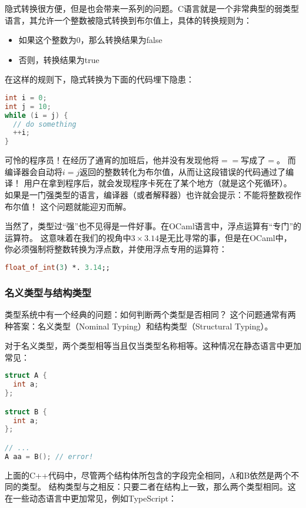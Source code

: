 \documentclass[../main.tex]{subfiles}
\begin{document}
  \indent 隐式转换很方便，但是也会带来一系列的问题。C语言就是一个非常典型的弱类型语言，其允许一个整数被隐式转换到布尔值上，具体的转换规则为：
  \begin{itemize}
    \item 如果这个整数为0，那么转换结果为false
    \item 否则，转换结果为true
  \end{itemize}

  \indent 在这样的规则下，隐式转换为下面的代码埋下隐患：

\begin{lstlisting}[language=c]
int i = 0;
int j = 10;
while (i = j) {
  // do something
  ++i;
}
\end{lstlisting}

  \indent 可怜的程序员！在经历了通宵的加班后，他并没有发现他将$==$写成了$=$。
  而编译器会自动将$i = j$返回的整数转化为布尔值，从而让这段错误的代码通过了编译！
  用户在拿到程序后，就会发现程序卡死在了某个地方（就是这个死循环）。
  如果是一门强类型的语言，编译器（或者解释器）也许就会提示：不能将整数视作布尔值！
  这个问题就能迎刃而解。

  \indent 当然了，类型过“强”也不见得是一件好事。在OCaml语言中，浮点运算有“专门”的运算符。
  这意味着在我们的视角中$3 \times 3.14$是无比寻常的事，但是在OCaml中，
  你必须强制将整数转换为浮点数，并使用浮点专用的运算符：

\begin{lstlisting}[language=ml]
float_of_int(3) *. 3.14;;
\end{lstlisting}

  \subsubsection*{名义类型与结构类型}
  \indent 类型系统中有一个经典的问题：如何判断两个类型是否相同？
  这个问题通常有两种答案：名义类型（Nominal Typing）和结构类型（Structural Typing）。

  \indent 对于名义类型，两个类型相等当且仅当类型名称相等。这种情况在静态语言中更加常见：

\begin{lstlisting}[language=c++]
struct A {
  int a;
};

struct B {
  int a;
};

// ...
A aa = B(); // error!
\end{lstlisting}

  \indent 上面的C++代码中，尽管两个结构体所包含的字段完全相同，A和B依然是两个不同的类型。
  结构类型与之相反：只要二者在结构上一致，那么两个类型相同。这在一些动态语言中更加常见，例如TypeScript：
\end{document}
